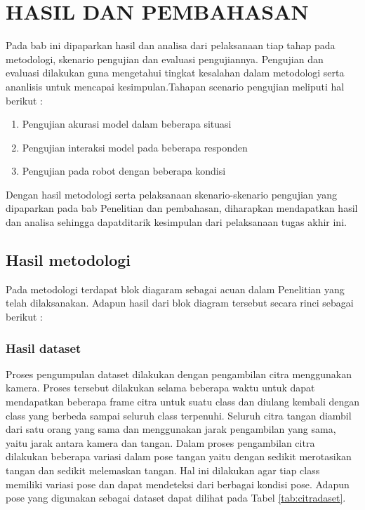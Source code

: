 \chapter{HASIL DAN PEMBAHASAN}


Pada bab ini dipaparkan hasil dan analisa dari pelaksanaan tiap tahap pada metodologi, skenario pengujian dan evaluasi pengujiannya. Pengujian dan evaluasi dilakukan guna mengetahui tingkat kesalahan dalam metodologi serta ananlisis untuk mencapai kesimpulan.Tahapan scenario pengujian meliputi hal berikut :

\begin{enumerate}
  \item Pengujian akurasi model dalam beberapa situasi
  \item Pengujian interaksi model pada beberapa responden
  \item Pengujian pada robot dengan beberapa kondisi
\end{enumerate}
Dengan hasil metodologi serta pelaksanaan skenario-skenario pengujian yang dipaparkan pada bab Penelitian dan pembahasan, diharapkan mendapatkan hasil dan analisa sehingga dapatditarik kesimpulan dari pelaksanaan tugas akhir ini.

\section{Hasil metodologi}
Pada metodologi terdapat blok diagaram sebagai acuan dalam Penelitian yang telah dilaksanakan. Adapun hasil dari blok diagram tersebut secara rinci sebagai berikut :

\subsection{Hasil dataset}
Proses pengumpulan dataset dilakukan dengan pengambilan citra menggunakan kamera. Proses tersebut dilakukan selama beberapa waktu untuk dapat mendapatkan beberapa frame citra untuk suatu class dan diulang kembali dengan class yang berbeda sampai seluruh class terpenuhi. Seluruh citra tangan diambil dari satu orang yang sama dan menggunakan jarak pengambilan yang sama, yaitu jarak antara kamera dan tangan. Dalam proses pengambilan citra dilakukan beberapa variasi dalam pose tangan yaitu dengan sedikit merotasikan tangan dan sedikit melemaskan tangan. Hal ini dilakukan agar tiap class memiliki variasi pose dan dapat mendeteksi dari berbagai kondisi pose. Adapun pose yang digunakan sebagai dataset dapat dilihat pada Tabel \ref{tab:citradaset}.

